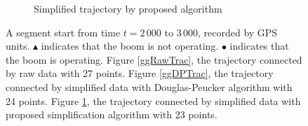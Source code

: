 \begin{figure}
\begin{subfigure}[t]{0.47\textwidth}
\caption{Simplified trajectory by proposed algorithm}\label{ggSPTrac}
\end{subfigure}
\caption{A segment start from time $t=2\,000$ to $3\,000$, recorded by GPS units. $\blacktriangle$ indicates that the boom is not operating. $\bullet$ indicates that the boom is operating. Figure \ref{ggRawTrac}, the trajectory connected by raw data with 27 points. Figure \ref{ggDPTrac}, the trajectory connected by simplified data with Douglas-Peucker algorithm with 24 points. Figure \ref{ggSPTrac}, the trajectory connected by simplified data with proposed simplification algorithm with 23  points.}\label{DataSimpRawTra}
\end{figure}

\clearpage

